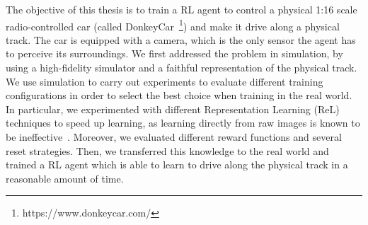 
The objective of this thesis is to train a RL agent to control a physical 1:16 scale radio-controlled car (called DonkeyCar~\footnote{https://www.donkeycar.com/}) and make it drive along a physical track. The car is equipped with a camera, which is the only sensor the agent has to perceive its surroundings. We first addressed the problem in simulation, by using a high-fidelity simulator and a faithful representation of the physical track. We use simulation to carry out experiments to evaluate different training configurations in order to select the best choice when training in the real world. In particular, we experimented with different Representation Learning (ReL) techniques to speed up learning, as learning directly from raw images is known to be ineffective~\cite{DBLP:journals/corr/abs-2008-00715}. Moreover, we evaluated different reward functions and several reset strategies. Then, we transferred this knowledge to the real world and trained a RL agent which is able to learn to drive along the physical track in a reasonable amount of time.


